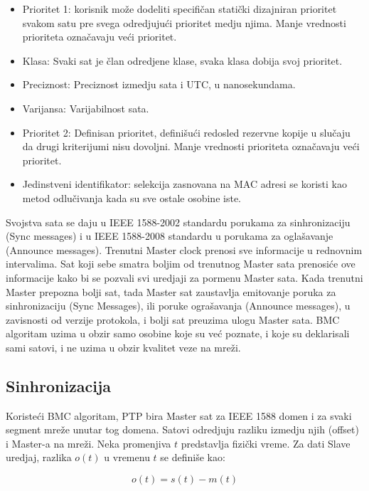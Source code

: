 \documentclass[a4paper,12pt, master]{etf}
\begin{document}
	\begin{itemize}
		\item Prioritet 1: korisnik mo\v{z}e dodeliti specifi\v{c}an
		stati\v{c}ki dizajniran prioritet svakom satu pre svega odredjuju\'{c}i
		prioritet medju njima. Manje vrednosti prioriteta ozna\v{c}avaju
		ve\'{c}i prioritet.
		\item Klasa: Svaki sat je \v{c}lan odredjene klase, svaka klasa dobija
		svoj prioritet.
		\item Preciznost: Preciznost izmedju sata i UTC, u nanosekundama.
		\item Varijansa: Varijabilnost sata.
		\item Prioritet 2: Definisan prioritet, defini\v{s}u\'{c}i redosled
		rezervne kopije u slu\v{c}aju da drugi kriterijumi nisu dovoljni. Manje
		vrednosti prioriteta ozna\v{c}avaju ve\'{c}i prioritet.
		\item Jedinstveni identifikator: selekcija zasnovana na MAC adresi se
		koristi kao metod odlu\v{c}ivanja kada su sve ostale osobine iste.
	\end{itemize}

	Svojstva sata se daju u IEEE 1588-2002 standardu porukama za sinhronizaciju
	(Sync messages) i u	IEEE 1588-2008 standardu u porukama za ogla\v{s}avanje
	(Announce messages). Trenutni Master clock prenosi sve informacije u
	rednovnim intervalima. Sat koji sebe smatra boljim od trenutnog Master
	sata prenosi\'{c}e ove informacije kako bi se pozvali svi uredjaji za
	pormenu Master sata. Kada trenutni Master prepozna bolji sat, tada Master
	sat	zaustavlja emitovanje poruka za sinhronizaciju (Sync Messages), ili
	poruke ogra\v{s}avanja (Announce messages), u zavisnosti od verzije
	protokola, i bolji sat preuzima ulogu Master sata. BMC algoritam uzima u
	obzir samo osobine koje su ve\'{c} poznate, i koje su deklarisali sami
	satovi, i ne uzima u obzir kvalitet veze na mre\v{z}i.

	\subsection{Sinhronizacija}

	Koriste\'{c}i BMC algoritam, PTP bira Master sat za IEEE 1588 domen i za
	svaki segment mre\v{z}e unutar tog domena. Satovi odredjuju razliku izmedju
	njih (offset) i Master-a na mre\v{z}i. Neka promenjiva $t$ predstavlja
	fizi\v{c}ki vreme. Za dati Slave uredjaj, razlika $o(t)$ u vremenu $t$ se
	defini\v{s}e kao:

	\begin{equation}
		o(t) = s(t) - m(t)
	\end{equation}
\end{document}
